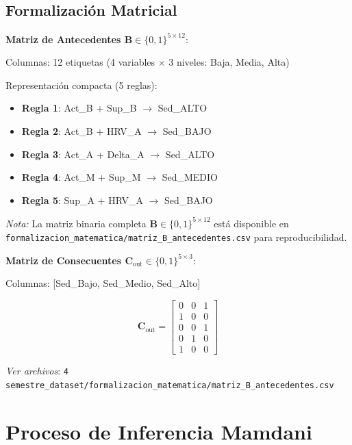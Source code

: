 \documentclass[12pt,letterpaper,twoside]{report}
\newcommand{\mat}[1]{\mathbf{#1}}
\begin{document}
\subsection{Formalización Matricial}

\begin{calculobox}
\textbf{Matriz de Antecedentes $\mat{B} \in \{0,1\}^{5 \times 12}$}:

Columnas: 12 etiquetas (4 variables $\times$ 3 niveles: Baja, Media, Alta)

Representación compacta (5 reglas):
\begin{itemize}[noitemsep]
    \item \textbf{Regla 1}: Act\_B + Sup\_B $\to$ Sed\_ALTO
    \item \textbf{Regla 2}: Act\_B + HRV\_A $\to$ Sed\_BAJO
    \item \textbf{Regla 3}: Act\_A + Delta\_A $\to$ Sed\_ALTO
    \item \textbf{Regla 4}: Act\_M + Sup\_M $\to$ Sed\_MEDIO
    \item \textbf{Regla 5}: Sup\_A + HRV\_A $\to$ Sed\_BAJO
\end{itemize}

\textit{Nota:} La matriz binaria completa $\mat{B} \in \{0,1\}^{5 \times 12}$ está disponible en \texttt{formalizacion\_matematica/matriz\_B\_antecedentes.csv} para reproducibilidad.

\textbf{Matriz de Consecuentes $\mat{C}_{\text{out}} \in \{0,1\}^{5 \times 3}$}:

Columnas: [Sed\_Bajo, Sed\_Medio, Sed\_Alto]

\begin{equation*}
\mat{C}_{\text{out}} = 
\begin{bmatrix}
0 & 0 & 1 \\
1 & 0 & 0 \\
0 & 0 & 1 \\
0 & 1 & 0 \\
1 & 0 & 0
\end{bmatrix}
\end{equation*}
\end{calculobox}

\textit{Ver archivos}: \texttt{4 semestre\_dataset/formalizacion\_matematica/matriz\_B\_antecedentes.csv}

\section{Proceso de Inferencia Mamdani}
\end{document}
